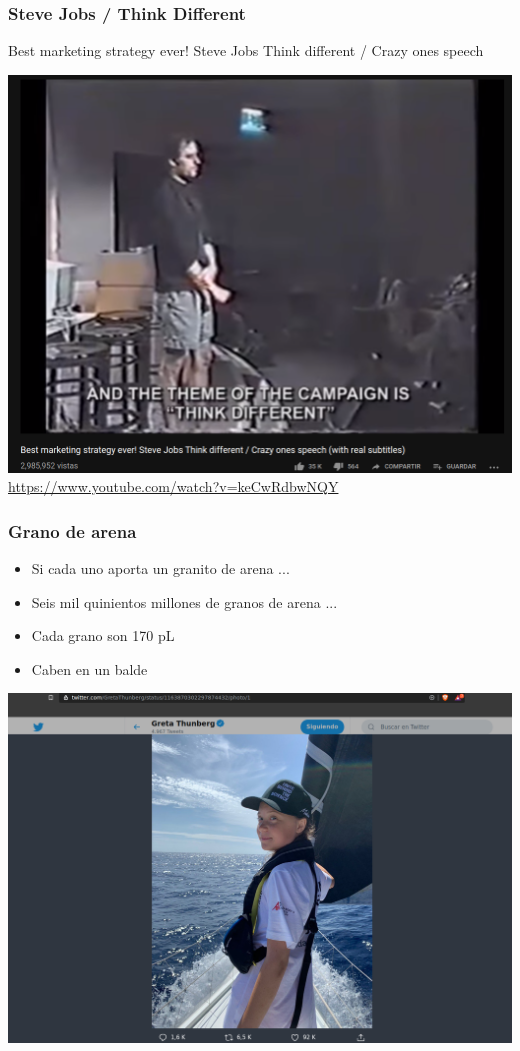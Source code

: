 \begin{frame}
  \frametitle{Steve Jobs / Think Different}

Best marketing strategy ever! Steve Jobs Think different / Crazy ones speech

\center
  \includegraphics[height=0.7\textheight]{stevejobs.png}
  \url{https://www.youtube.com/watch?v=keCwRdbwNQY}

\end{frame}

\begin{frame}
  \frametitle{Grano de arena}

  \begin{itemize}
    \item Si cada uno aporta un granito de arena ...
      \pause
    \item Seis mil quinientos millones de granos de arena ...
      \pause
    ­\item Cada grano son 170 pL
    \item Caben en un balde
  \end{itemize}

\end{frame}

\begin{frame}
  \center \includegraphics[height=\textheight]{greta.png}
\end{frame}

